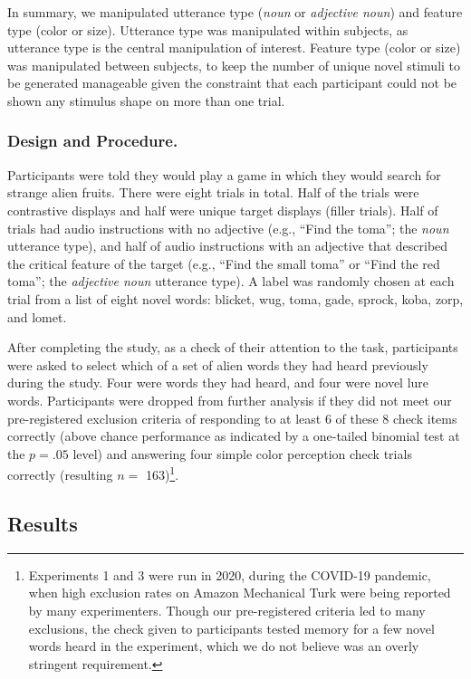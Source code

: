 \documentclass[
  english,
  man,floatsintext]{apa6}
\begin{document}
In summary, we manipulated utterance type (\emph{noun} or \emph{adjective noun}) and feature type (color or size). Utterance type was manipulated within subjects, as utterance type is the central manipulation of interest. Feature type (color or size) was manipulated between subjects, to keep the number of unique novel stimuli to be generated manageable given the constraint that each participant could not be shown any stimulus shape on more than one trial.

\hypertarget{design-and-procedure.}{%
\subsubsection{Design and Procedure.}\label{design-and-procedure.}}

Participants were told they would play a game in which they would search for strange alien fruits. There were eight trials in total. Half of the trials were contrastive displays and half were unique target displays (filler trials). Half of trials had audio instructions with no adjective (e.g., ``Find the toma''; the \emph{noun} utterance type), and half of audio instructions with an adjective that described the critical feature of the target (e.g., ``Find the small toma'' or ``Find the red toma''; the \emph{adjective noun} utterance type). A label was randomly chosen at each trial from a list of eight novel words: blicket, wug, toma, gade, sprock, koba, zorp, and lomet.

After completing the study, as a check of their attention to the task, participants were asked to select which of a set of alien words they had heard previously during the study. Four were words they had heard, and four were novel lure words. Participants were dropped from further analysis if they did not meet our pre-registered exclusion criteria of responding to at least 6 of these 8 check items correctly (above chance performance as indicated by a one-tailed binomial test at the \(p = .05\) level) and answering four simple color perception check trials correctly (resulting \(n =\) 163)\footnote{Experiments 1 and 3 were run in 2020, during the COVID-19 pandemic, when high exclusion rates on Amazon Mechanical Turk were being reported by many experimenters. Though our pre-registered criteria led to many exclusions, the check given to participants tested memory for a few novel words heard in the experiment, which we do not believe was an overly stringent requirement.}.

\hypertarget{results}{%
\subsection{Results}\label{results}}
\end{document}
